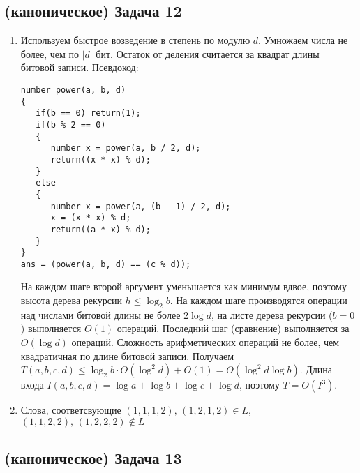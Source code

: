 \documentclass[a4paper]{article}
\begin{document}
\begin{enumerate}
\subsection*{(каноническое) Задача 12}
\begin{enumerate}
\item Используем быстрое возведение в степень по модулю $d$. Умножаем числа не более, чем по $|d|$ бит. Остаток от деления считается за квадрат длины битовой записи. Псевдокод:
\begin{lstlisting}
number power(a, b, d)
{
   if(b == 0) return(1);
   if(b % 2 == 0)
   {
      number x = power(a, b / 2, d);
      return((x * x) % d);
   }
   else
   {
      number x = power(a, (b - 1) / 2, d);
      x = (x * x) % d;
      return((a * x) % d);
   }
}
ans = (power(a, b, d) == (c % d));
\end{lstlisting}
На каждом шаге второй аргумент уменьшается как минимум вдвое, поэтому высота дерева рекурсии $h\leqslant \log_2 b$. На каждом шаге производятся операции над числами битовой длины не более $2\log d$, на листе дерева рекурсии ($b=0$) выполняется $O(1)$ операций. Последний шаг (сравнение) выполняется за $O(\log d)$ операций. Сложность арифметических операций не более, чем квадратичная по длине битовой записи.\newline
Получаем $T(a, b, c, d)\leqslant \log_2 b\cdot O(\log^2 d)+O(1)=O(\log^2 d\log b)$. Длина входа $I(a,b,c,d)=\log a+\log b+\log c+\log d$, поэтому $T=O(I^3)$.
\item Слова, соответсвующие $(1,1,1,2),\,(1,2,1,2)\in L$, $(1,1,2,2),\,(1,2,2,2)\notin L$
\end{enumerate}
\end{enumerate}
\subsection*{(каноническое) Задача 13}
\end{document}

